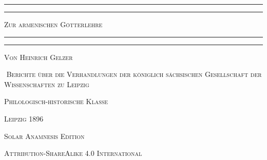 \documentclass{article}
\begin{document}
\bfseries
\renewcommand\thefootnote{{\color{armeniaRed}\bfseries\tiny\arabic{footnote}}}
\let\oldfootnote\footnote
    \renewcommand{\footnote}[1]{\oldfootnote{\bfseries\color{armeniaRed}\small#1}}
\begin{titlepage} %
	\centering %


	\rule{\textwidth}{1.6pt}\vspace*{-\baselineskip}\vspace*{2pt} %
	\rule{\textwidth}{0.4pt} %
	
	\vspace{0.5\baselineskip} %
	
	{\color{armeniaRed}\scshape\Huge Zur armenischen Götterlehre}
	
	\vspace{0.5\baselineskip} %

	\rule{\textwidth}{0.4pt}\vspace*{-\baselineskip}\vspace{3.2pt} %
	\rule{\textwidth}{1.6pt} %
	
	\vspace{0.1\baselineskip} %
	
	
        {\scshape Von \large Heinrich Gelzer}
 
        \vspace{0.5\baselineskip}

‌        {\color{armeniaRed}\scshape\small Berichte über die Verhandlungen der königlich sächsischen Gesellschaft der Wissenschaften zu Leipzig}

        \vspace*{\fill}    

        \vspace{0.5\baselineskip}

        {\scshape Philologisch-historische Klasse}
        
	\vspace{0.5\baselineskip}

        {\scshape\small Leipzig 1896}
		
	\vspace{0.1\baselineskip} %

        {\color{armeniaRed}\scshape\small Solar Anamnesis Edition}%
    
	{\color{armeniaRed}\scshape\footnotesize Attribution-ShareAlike 4.0 International } %
\end{titlepage}
\clearpage
\tableofcontents
\clearpage
\end{document}
